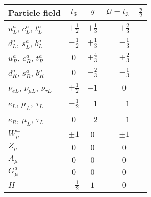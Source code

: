 \begin{tabular}{l|ccc}
    \hline
   Particle field & $t_3$ & $y$ & $\mathcal{Q}=t_3+\frac{y}{2}$ \\ \hline
   $u^a_L$, $c^a_L$, $t^a_L$ & $+\frac{1}{2}$ & $+\frac{1}{3}$ & $+\frac{2}{3}$ \\
   $d^a_L$, $s^a_L$, $b^a_L$ & $-\frac{1}{2}$ & $+\frac{1}{3}$ & $-\frac{1}{3}$ \\
   $u^a_R$, $c^a_R$, $t^a_R$ & $0$ & $+\frac{4}{3}$ & $+\frac{2}{3}$ \\
   $d^a_R$, $s^a_R$, $b^a_R$ & $0$ & $-\frac{2}{3}$ & $-\frac{1}{3}$ \\
   \hline
   $\nu_{eL}$, $\nu_{{\mu}L}$, $\nu_{{\tau}L}$ & $+\frac{1}{2}$ & $-1$ & $0$ \\
   $e_L$, $\mu_L$, $\tau_L$ & $-\frac{1}{2}$ & $-1$ & $-1$ \\
   $e_R$, $\mu_L$, $\tau_L$ & $0$ & $-2$ & $-1$ \\
   \hline
   $W^{\pm}_\mu$ & $\pm 1$ & $0$ & $\pm 1$ \\
   $Z_\mu$ & $0$ & $0$ & $0$ \\
   $A_\mu$ & $0$ & $0$ & $0$ \\
   $G^a_{\mu}$ & $0$ & $0$ & $0$ \\
   \hline
  $H$ & $-\frac{1}{2}$ & $1$ & $0$ \\
   \hline
\end{tabular}